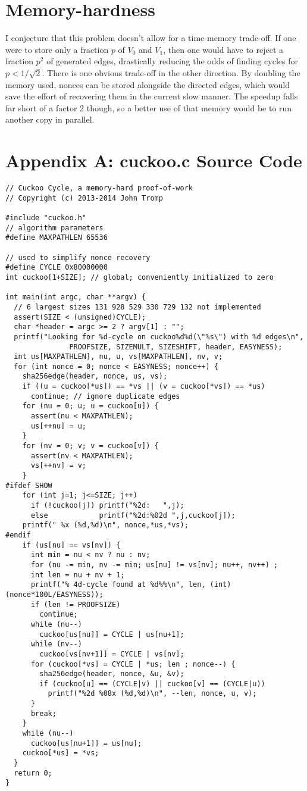 \documentclass[11pt, oneside]{article}
\begin{document}
\section{Memory-hardness}
I conjecture that this problem doesn't allow for a time-memory trade-off. If
one were to store only a fraction $p$ of $V_0$ and $V_1$, then one would have
to reject a fraction $p^2$ of generated edges, drastically reducing the odds of
finding cycles for $p<1/\sqrt{2}$.
There is one obvious trade-off in the other direction. By doubling the memory
used, nonces can be stored alongside the directed edges, which would save the
effort of recovering them in the current slow manner. The speedup falls far
short of a factor 2 though, so a better use of that memory would be to run
another copy in parallel.




\section{Appendix A: cuckoo.c Source Code}
\footnotesize
\begin{verbatim}
// Cuckoo Cycle, a memory-hard proof-of-work
// Copyright (c) 2013-2014 John Tromp

#include "cuckoo.h"
// algorithm parameters
#define MAXPATHLEN 65536

// used to simplify nonce recovery
#define CYCLE 0x80000000
int cuckoo[1+SIZE]; // global; conveniently initialized to zero

int main(int argc, char **argv) {
  // 6 largest sizes 131 928 529 330 729 132 not implemented
  assert(SIZE < (unsigned)CYCLE);
  char *header = argc >= 2 ? argv[1] : "";
  printf("Looking for %d-cycle on cuckoo%d%d(\"%s\") with %d edges\n",
               PROOFSIZE, SIZEMULT, SIZESHIFT, header, EASYNESS);
  int us[MAXPATHLEN], nu, u, vs[MAXPATHLEN], nv, v; 
  for (int nonce = 0; nonce < EASYNESS; nonce++) {
    sha256edge(header, nonce, us, vs);
    if ((u = cuckoo[*us]) == *vs || (v = cuckoo[*vs]) == *us)
      continue; // ignore duplicate edges
    for (nu = 0; u; u = cuckoo[u]) {
      assert(nu < MAXPATHLEN);
      us[++nu] = u;
    }
    for (nv = 0; v; v = cuckoo[v]) {
      assert(nv < MAXPATHLEN);
      vs[++nv] = v;
    }
#ifdef SHOW
    for (int j=1; j<=SIZE; j++)
      if (!cuckoo[j]) printf("%2d:   ",j);
      else            printf("%2d:%02d ",j,cuckoo[j]);
    printf(" %x (%d,%d)\n", nonce,*us,*vs);
#endif
    if (us[nu] == vs[nv]) {
      int min = nu < nv ? nu : nv;
      for (nu -= min, nv -= min; us[nu] != vs[nv]; nu++, nv++) ;
      int len = nu + nv + 1;
      printf("% 4d-cycle found at %d%%\n", len, (int)(nonce*100L/EASYNESS));
      if (len != PROOFSIZE)
        continue;
      while (nu--)
        cuckoo[us[nu]] = CYCLE | us[nu+1];
      while (nv--)
        cuckoo[vs[nv+1]] = CYCLE | vs[nv];
      for (cuckoo[*vs] = CYCLE | *us; len ; nonce--) {
        sha256edge(header, nonce, &u, &v);
        if (cuckoo[u] == (CYCLE|v) || cuckoo[v] == (CYCLE|u))
          printf("%2d %08x (%d,%d)\n", --len, nonce, u, v);
      }
      break;
    }
    while (nu--)
      cuckoo[us[nu+1]] = us[nu];
    cuckoo[*us] = *vs;
  }
  return 0;
}
\end{verbatim}
\end{document}
